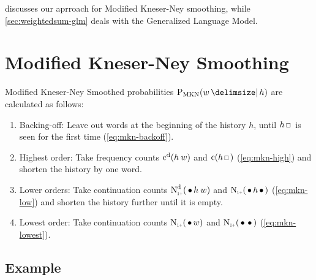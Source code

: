  discusses our aprroach for Modified Kneser-Ney
smoothing, while \cref{sec:weightedsum-glm} deals with the Generalized
Language Model.


\clearpage
\section{Modified Kneser-Ney Smoothing}
\label{sec:weightedsum-mkn}

Modified Kneser-Ney Smoothed probabilities $\ProbMKN{w}{h}$ are calculated as
follows:
\begin{enumerate}
  \item Backing-off: Leave out words at the beginning of the history $h$, until
    $h \Skp$ is seen for the first time (\cref{eq:mkn-backoff}).
  \item Highest order: Take frequency counts $\DiscountedCount(h \: w)$ and
    $\Count(h \Skp)$ (\cref{eq:mkn-high}) and shorten the history by one word.
  \item Lower orders: Take continuation counts $\DiscountedCount*(\WSkp h \: w)$
    and $\ContCountIp(\WSkp h \WSkp)$ (\cref{eq:mkn-low}) and shorten the
    history further until it is empty.
  \item Lowest order: Take continuation counts $\ContCountIp(\WSkp w)$ and
    $\ContCountIp(\WSkp \WSkp)$ (\cref{eq:mkn-lowest}).
\end{enumerate}

\newcommand{\ProbMKNcab}[1]
  {\frac{\DiscountedCount(w_1 w_2 w_3) + \gamma(w_1 w_2) #1}{\Count(w_1 w_2 \Skp)}}
\newcommand{\ProbMKNcb}[1]
  {\frac{\DiscountedCount*(\WSkp w_2 w_3) + \gamma(w_2) #1}{\ContCountIp(\WSkp w_2 \WSkp)}}
\newcommand{\ProbMKNc}
  {\frac{\ContCountIp(\WSkp w_3)}{\ContCountIp(\WSkp \WSkp)}}

\subsection{Example}

